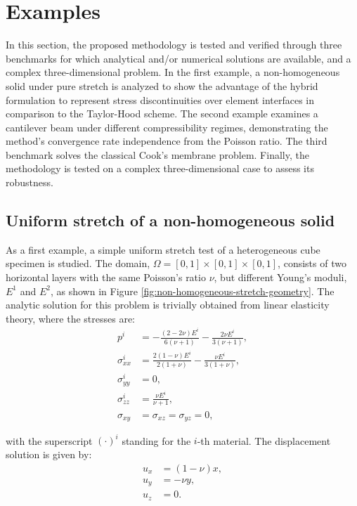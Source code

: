 \documentclass[english,11pt,3p,number,sort&compress]{elsarticle}
\begin{document}
\section{Examples \label{sec:Examples}}

In this section, the proposed methodology is tested and verified through three benchmarks for which analytical and/or numerical solutions are available, and a complex three-dimensional problem. In the first example, a non-homogeneous solid under pure stretch is analyzed to show the advantage of the hybrid formulation to represent stress discontinuities over element interfaces in comparison to the Taylor-Hood scheme. The second example examines a cantilever beam under different compressibility regimes, demonstrating the method's convergence rate independence from the Poisson ratio. The third benchmark solves the classical Cook's membrane problem. Finally, the methodology is tested on a complex three-dimensional case to assess its robustness.

\subsection{Uniform stretch of a non-homogeneous solid \label{subsec:non-homogeneous}}

As a first example, a simple uniform stretch test of a heterogeneous cube specimen is studied. The domain, $\Omega=[0,1] \times [0,1] \times [0,1]$, consists of two horizontal layers with the same Poisson's ratio $\nu$, but different Young's moduli, $E^1$ and $E^2$, as shown in Figure \ref{fig:non-homogeneous-stretch-geometry}. The analytic solution for this problem is trivially obtained from linear elasticity theory, where the stresses are:
\begin{equation}
	\begin{aligned}
		p^i &= -\frac{(2-2 \nu ) E^i}{6 (\nu +1)}-\frac{2 \nu 
		E^i}{3 (\nu +1)}, \\
		\sigma^i_{xx} &= \frac{2(1-\nu)E^i}{2(1+\nu)}-\frac{\nu E^i}{3(1+\nu)}, \\
		\sigma^i_{yy} &= 0, \\
		\sigma^i_{zz} &= \frac{\nu E^i}{\nu +1}, \\
		\sigma_{xy} &= \sigma_{xz} = \sigma_{yz} = 0,
	\end{aligned}
\end{equation}

\noindent with the superscript $(\cdot)^i$ standing for the $i$-th material. The displacement solution is given by:
\begin{equation}
	\begin{aligned}
		u_x &= (1-\nu)x, \\
		u_y &= -\nu y, \\
		u_z &= 0.
	\end{aligned}
\end{equation}
\end{document}
